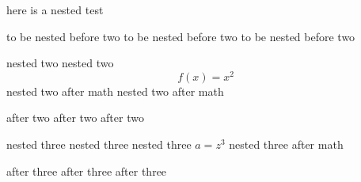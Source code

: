 here is a nested test
\begin{one}
	to be nested before two
	to be nested before two
	to be nested before two
	\begin{two}
		nested two
		nested two
        \[ f(x)=x^2
        \]
		nested two after math
		nested two after math
	\end{two}
    after two
    after two
    after two
	\begin{three}
		nested three
		nested three
		nested three
        $a = z^3$
		nested three after math
	\end{three}
    after three
    after three
    after three
\end{one}
